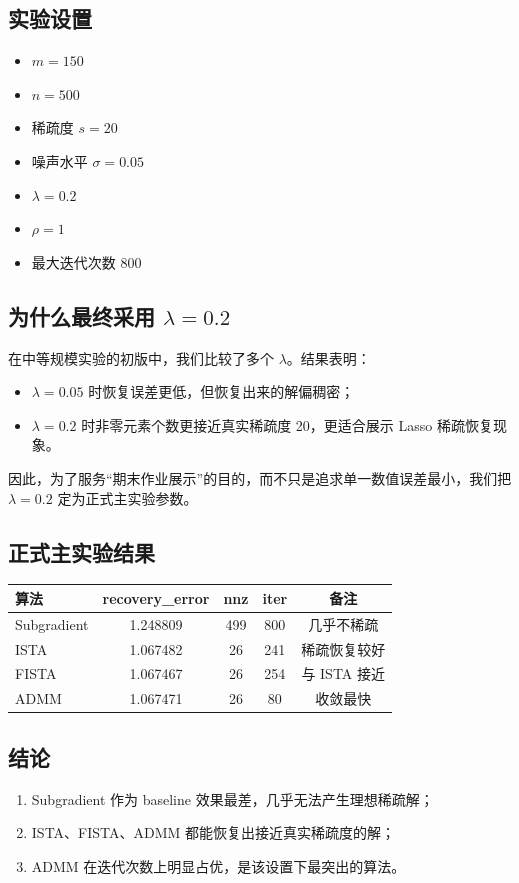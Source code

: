 \documentclass[12pt,a4paper]{ctexart}
\begin{document}
\subsection{实验设置}
\begin{itemize}[leftmargin=2em]
    \item $m=150$
    \item $n=500$
    \item 稀疏度 $s=20$
    \item 噪声水平 $\sigma=0.05$
    \item $\lambda=0.2$
    \item $\rho=1$
    \item 最大迭代次数 800
\end{itemize}

\subsection{为什么最终采用 $\lambda=0.2$}
在中等规模实验的初版中，我们比较了多个 $\lambda$。结果表明：
\begin{itemize}[leftmargin=2em]
    \item $\lambda=0.05$ 时恢复误差更低，但恢复出来的解偏稠密；
    \item $\lambda=0.2$ 时非零元素个数更接近真实稀疏度 20，更适合展示 Lasso 稀疏恢复现象。
\end{itemize}
因此，为了服务“期末作业展示”的目的，而不只是追求单一数值误差最小，我们把 $\lambda=0.2$ 定为正式主实验参数。

\subsection{正式主实验结果}
\begin{center}
\begin{tabular}{lcccc}
\toprule
算法 & recovery\_error & nnz & iter & 备注 \\
\midrule
Subgradient & 1.248809 & 499 & 800 & 几乎不稀疏 \\
ISTA & 1.067482 & 26 & 241 & 稀疏恢复较好 \\
FISTA & 1.067467 & 26 & 254 & 与 ISTA 接近 \\
ADMM & 1.067471 & 26 & 80 & 收敛最快 \\
\bottomrule
\end{tabular}
\end{center}

\subsection{结论}
\begin{enumerate}[label=\arabic*.]
    \item Subgradient 作为 baseline 效果最差，几乎无法产生理想稀疏解；
    \item ISTA、FISTA、ADMM 都能恢复出接近真实稀疏度的解；
    \item ADMM 在迭代次数上明显占优，是该设置下最突出的算法。
\end{enumerate}
\end{document}
